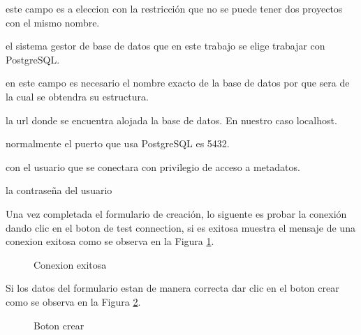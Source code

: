 \begin{description}[align=left]
\item [Nombre] este campo es a eleccion con la restricci\'on que no se puede tener dos proyectos con el mismo nombre.
\item [sgbd] el sistema gestor de base de datos que en este trabajo se elige trabajar con PostgreSQL.
\item [base de datos] en este campo es necesario el nombre exacto de la base de datos por que sera de la cual se obtendra su estructura.
\item [host] la url donde se encuentra alojada la base de datos. En nuestro caso localhost.
\item [puerto] normalmente el puerto que usa PostgreSQL es 5432.
\item [usuario] con el usuario que se conectara con privilegio de acceso a metadatos.
\item [password] la contrase\~na del usuario
\end{description}
Una vez completada el formulario de creaci\'on, lo siguente es probar la conexi\'on dando clic en el boton de test connection, si es exitosa muestra el mensaje de una conexion exitosa como se observa en la Figura \ref{fig:connectionsuccessfull}.
\begin{figure}[H]
\caption{Conexion exitosa} \label{fig:connectionsuccessfull}
\centering
{}
\end{figure}
Si los datos del formulario estan de manera correcta dar clic en el boton crear como se observa en la  Figura \ref{fig:createbutton}. 
\begin{figure}[H]
\caption{Boton crear} \label{fig:createbutton}
\centering
{}
\end{figure}

